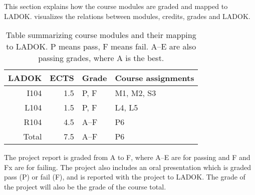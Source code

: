 This section explains how the course modules are graded and mapped to LADOK\@.
 visualizes the relations between modules, credits, grades and 
LADOK\@.

\begin{table}
  \centering
  \setlength{\tabcolsep}{0.5em}
  \begin{tabular}{r r l l}
    \toprule
    LADOK & ECTS  & Grade       & Course assignments\\
    \midrule
    I104  & 1.5   & P, F        & M1, M2, S3\\
    L104  & 1.5   & P, F        & L4, L5\\
    R104  & 4.5   & A--F        & P6\\
    \midrule
    Total & 7.5   & A--F        & P6\\
    \bottomrule
  \end{tabular}
  \caption{%
    Table summarizing course modules and their mapping to LADOK\@.
    P means pass, F means fail.
    A--E are also passing grades, where A is the best.
  }\label{LADOKTable}
\end{table}

The project report is graded from A to F, where A--E are for passing and F and 
Fx are for failing.
The project also includes an oral presentation which is graded pass (P) or fail 
(F), and is reported with the project to LADOK\@.
The grade of the project will also be the grade of the course total.

